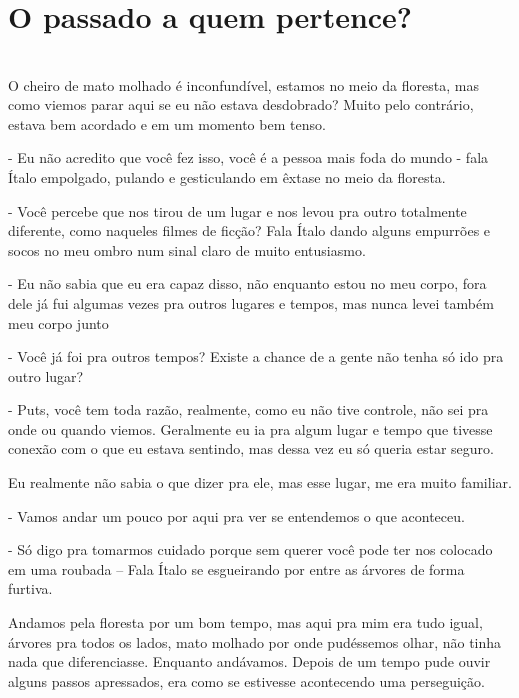\newpage


\ifdefined\useChapters
\chapter{O passado a quem pertence?}
 
\else
\chapter{}
\fi
O cheiro de mato molhado é inconfundível, estamos no meio da floresta, mas como viemos parar aqui se eu não estava desdobrado? Muito pelo contrário, estava bem acordado e em um momento bem tenso. 

- Eu não acredito que você fez isso, você é a pessoa mais foda do mundo - fala Ítalo empolgado, pulando e gesticulando em êxtase no meio da floresta.

- Você percebe que nos tirou de um lugar e nos levou pra outro totalmente diferente, como naqueles filmes de ficção? Fala Ítalo dando alguns empurrões e socos no meu ombro num sinal claro de muito entusiasmo.

- Eu não sabia que eu era capaz disso, não enquanto estou no meu corpo, fora dele já fui algumas vezes pra outros lugares e tempos, mas nunca levei também meu corpo junto

- Você já foi pra outros tempos? Existe a chance de a gente não tenha só ido pra outro lugar?

- Puts, você tem toda razão, realmente, como eu não tive controle, não sei pra onde ou quando viemos. Geralmente eu ia pra algum lugar e tempo que tivesse conexão com o que eu estava sentindo, mas dessa vez eu só queria estar seguro.

Eu realmente não sabia o que dizer pra ele, mas esse lugar, me era muito familiar.

- Vamos andar um pouco por aqui pra ver se entendemos o que aconteceu.

- Só digo pra tomarmos cuidado porque sem querer você pode ter nos colocado em uma roubada -- Fala Ítalo se esgueirando por entre as árvores de forma furtiva.

Andamos pela floresta por um bom tempo, mas aqui pra mim era tudo igual, árvores pra todos os lados, mato molhado por onde pudéssemos olhar, não tinha nada que diferenciasse. Enquanto andávamos. Depois de um tempo pude ouvir alguns passos apressados, era como se estivesse acontecendo uma perseguição.

